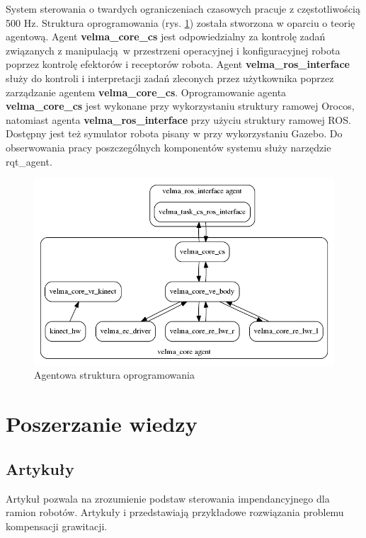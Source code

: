 \documentclass[12pt,a4paper]{article}
\begin{document}
	System sterowania o twardych ograniczeniach czasowych pracuje z częstotliwością 500 Hz. Struktura oprogramowania (rys. \ref{fig:agenty}) została stworzona w oparciu o teorię agentową. Agent \textbf{velma\_core\_cs} jest odpowiedzialny za kontrolę zadań związanych z manipulacją w przestrzeni operacyjnej i konfiguracyjnej robota poprzez kontrolę efektorów i receptorów robota. Agent \textbf{velma\_ros\_interface} służy do kontroli i interpretacji zadań zleconych przez użytkownika poprzez zarządzanie agentem \textbf{velma\_core\_cs}. Oprogramowanie agenta \textbf{velma\_core\_cs} jest wykonane przy wykorzystaniu struktury ramowej Orocos, natomiast agenta \textbf{velma\_ros\_interface} przy użyciu struktury ramowej ROS. Dostępny jest też symulator robota pisany w przy wykorzystaniu Gazebo. Do obserwowania pracy poszczególnych komponentów systemu służy narzędzie rqt\_agent.

	\begin{figure}[H]
		\centering
		\includegraphics[width=0.8\linewidth]{agenty}
		\caption{Agentowa struktura oprogramowania \cite{velma}}
		\label{fig:agenty}
	\end{figure}

	\section{Poszerzanie wiedzy}
	\subsection{Artykuły}
	Artykuł \cite{impedance} pozwala na zrozumienie podstaw sterowania impendancyjnego dla ramion robotów. Artykuły \cite{gravity1} i \cite{gravity2} przedstawiają przykładowe rozwiązania problemu kompensacji grawitacji.
\end{document}
